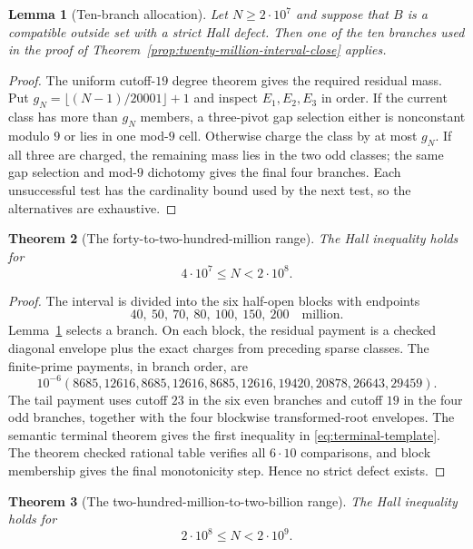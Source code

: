 \documentclass[11pt]{article}
\newtheorem{theorem}{Theorem}[section]
\newtheorem{lemma}[theorem]{Lemma}
\theoremstyle{definition}
\newcommand{\TwentyMillion}{2\cdot10^7}
\newcommand{\FortyMillion}{4\cdot10^7}
\newcommand{\TwoHundredMillion}{2\cdot10^8}
\newcommand{\TwoBillion}{2\cdot10^9}
\begin{document}
\begin{lemma}[Ten-branch allocation]\label{lem:global-ten-branch-allocation}
Let $N\geq\TwentyMillion$ and suppose that $B$ is a compatible outside set
with a strict Hall defect.  Then one of the ten branches used in the proof
of Theorem~\ref{prop:twenty-million-interval-close} applies.
\end{lemma}

\begin{proof}
The uniform cutoff-$19$ degree theorem gives the required residual mass.
Put $g_N=\lfloor (N-1)/20001\rfloor+1$ and inspect $E_1,E_2,E_3$ in order.  If
the current class has more than $g_N$ members, a three-pivot gap selection
either is nonconstant modulo $9$ or lies in one mod-$9$ cell.  Otherwise
charge the class by at most $g_N$.  If all three are charged, the remaining
mass lies in the two odd classes; the same gap selection and mod-$9$
dichotomy gives the final four branches.  Each unsuccessful test has the
cardinality bound used by the next test, so the alternatives are exhaustive.
\end{proof}

\begin{theorem}[The forty-to-two-hundred-million range]
\label{thm:mixed-joint-tail-close}
The Hall inequality holds for
\[
 \FortyMillion\leq N<\TwoHundredMillion.
\]
\end{theorem}

\begin{proof}
The interval is divided into the six half-open blocks with endpoints
\[
 40,\ 50,\ 70,\ 80,\ 100,\ 150,\ 200
\quad\text{million}.
\]
Lemma~\ref{lem:global-ten-branch-allocation} selects a branch.  On each
block, the residual payment is a checked diagonal envelope plus the exact
charges from preceding sparse classes.  The finite-prime payments, in branch
order, are
\[
 10^{-6}(8685,12616,8685,12616,8685,12616,
 19420,20878,26643,29459).
\]
The tail payment uses cutoff $23$ in the six even branches and cutoff $19$
in the four odd branches, together with the four blockwise transformed-root
envelopes.  The semantic terminal theorem gives the first inequality in
\eqref{eq:terminal-template}.  The theorem
  checked rational table verifies all $6\cdot10$ comparisons, and block
  membership gives the final
monotonicity step.  Hence no strict defect exists.
\end{proof}

\begin{theorem}[The two-hundred-million-to-two-billion range]
\label{thm:actual-support-mixed-close}
The Hall inequality holds for
\[
 \TwoHundredMillion\leq N<\TwoBillion.
\]
\end{theorem}
\end{document}
